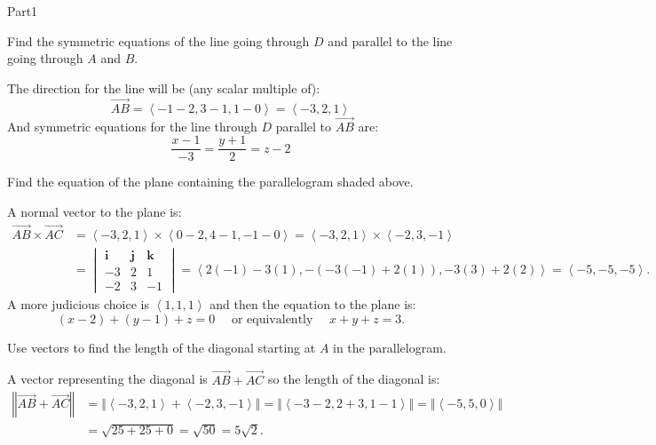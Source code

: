 \documentclass{report}
\newcommand{\norm}[1]{\left\Vert #1 \right\Vert}
\newcommand{\avec}[1]{\left\langle #1 \right\rangle}
\newcommand{\vect}[1]{\overrightarrow{#1}}
\begin{document}
\begin{exam}{Part1}
\begin{problem*}[\auto]
\begin{parts}
\item{} Find the symmetric equations of the line going through $D$ and parallel to the line going through $A$ and $B$.
\begin{solution}[1.5in] The direction for the line will be (any scalar multiple of):
$$\vect{AB}=\avec{-1-2,3-1,1-0}=\avec{-3,2,1} $$
And symmetric equations for the line through $D$ parallel to $\vect{AB}$ are:
$$\boxed{\dfrac{x-1}{-3}=\dfrac{y+1}{2}=z-2}$$
\end{solution}
\item{} Find the equation of the plane containing the parallelogram shaded above.
\begin{solution}[2.5in] A normal vector to the plane is:
\begin{align*}
\vect{AB}\times\vect{AC}&=\avec{-3,2,1}\times\avec{0-2,4-1,-1-0}=\avec{-3,2,1}\times\avec{-2,3,-1}\\
&=\begin{vmatrix}
\mathbf{i} & \mathbf{j} & \mathbf{k} \\
-3 & 2 & 1 \\
-2 & 3 & -1
\end{vmatrix}=\avec{2(-1)-3(1),-(-3(-1)+2(1)),-3(3)+2(2)}=\avec{-5,-5,-5}. 
\end{align*}
A more judicious choice is $\avec{1,1,1}$ and then the equation to the plane is:
$$\boxed{(x-2)+(y-1)+z=0}\quad\text{ or equivalently }\quad \boxed{x+y+z=3}. $$
\end{solution}
\item{} Use vectors to find the length of the diagonal starting at $A$ in the parallelogram. 
\begin{solution}[1.5in]
A vector representing the diagonal is $\vect{AB}+\vect{AC}$ so the length of the diagonal is:
\begin{align*}
\norm{\vect{AB}+\vect{AC}}&=\norm{\avec{-3,2,1}+\avec{-2,3,-1}}=\norm{\avec{-3-2,2+3,1-1}}=\norm{\avec{-5,5,0}}\\
&=\sqrt{25+25+0}=\sqrt{50}=\boxed{5\sqrt{2}}.
\end{align*}
\end{solution}

\end{parts}
\end{problem*}


\end{exam}
\end{document}
